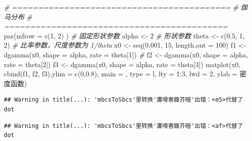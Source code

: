 \documentclass[
]{book}
\newenvironment{Shaded}{\begin{snugshade}}{\end{snugshade}}
\newcommand{\AttributeTok}[1]{\textcolor[rgb]{0.77,0.63,0.00}{#1}}
\newcommand{\CommentTok}[1]{\textcolor[rgb]{0.56,0.35,0.01}{\textit{#1}}}
\newcommand{\DecValTok}[1]{\textcolor[rgb]{0.00,0.00,0.81}{#1}}
\newcommand{\FloatTok}[1]{\textcolor[rgb]{0.00,0.00,0.81}{#1}}
\newcommand{\FunctionTok}[1]{\textcolor[rgb]{0.00,0.00,0.00}{#1}}
\newcommand{\NormalTok}[1]{#1}
\newcommand{\OtherTok}[1]{\textcolor[rgb]{0.56,0.35,0.01}{#1}}
\newcommand{\SpecialCharTok}[1]{\textcolor[rgb]{0.00,0.00,0.00}{#1}}
\newcommand{\StringTok}[1]{\textcolor[rgb]{0.31,0.60,0.02}{#1}}
\begin{document}
\begin{Shaded}
\begin{Highlighting}[]
\CommentTok{\# ==========================================}
\CommentTok{\# 伽马分布}
\CommentTok{\# ===========================================}
\FunctionTok{par}\NormalTok{(}\AttributeTok{mfrow =} \FunctionTok{c}\NormalTok{(}\DecValTok{1}\NormalTok{, }\DecValTok{2}\NormalTok{) )}
\CommentTok{\# 固定形状参数}
\NormalTok{alpha }\OtherTok{\textless{}{-}} \DecValTok{2}                \CommentTok{\# 形状参数}
\NormalTok{theta }\OtherTok{\textless{}{-}} \FunctionTok{c}\NormalTok{(}\FloatTok{0.5}\NormalTok{, }\DecValTok{1}\NormalTok{, }\DecValTok{2}\NormalTok{)     }\CommentTok{\# 比率参数，尺度参数为 1/theta}
\NormalTok{x0 }\OtherTok{\textless{}{-}} \FunctionTok{seq}\NormalTok{(}\FloatTok{0.001}\NormalTok{, }\DecValTok{15}\NormalTok{, }\AttributeTok{length.out =} \DecValTok{100}\NormalTok{)}
\NormalTok{f1 }\OtherTok{\textless{}{-}} \FunctionTok{dgamma}\NormalTok{(x0,  }\AttributeTok{shape =}\NormalTok{ alpha, }\AttributeTok{rate =}\NormalTok{ theta[}\DecValTok{1}\NormalTok{]) }\CommentTok{\# }
\NormalTok{f2 }\OtherTok{\textless{}{-}} \FunctionTok{dgamma}\NormalTok{(x0,  }\AttributeTok{shape =}\NormalTok{ alpha, }\AttributeTok{rate =}\NormalTok{ theta[}\DecValTok{2}\NormalTok{])}
\NormalTok{f3 }\OtherTok{\textless{}{-}} \FunctionTok{dgamma}\NormalTok{(x0,  }\AttributeTok{shape =}\NormalTok{ alpha, }\AttributeTok{rate =}\NormalTok{ theta[}\DecValTok{3}\NormalTok{])}
\FunctionTok{matplot}\NormalTok{(x0, }\FunctionTok{cbind}\NormalTok{(f1, f2, f3),}\AttributeTok{ylim =} \FunctionTok{c}\NormalTok{(}\DecValTok{0}\NormalTok{,}\FloatTok{0.8}\NormalTok{), }\AttributeTok{main =} \StringTok{\textquotesingle{}\textquotesingle{}}\NormalTok{,  }\AttributeTok{type =} \StringTok{\textquotesingle{}l\textquotesingle{}}\NormalTok{, }\AttributeTok{lty =} \DecValTok{1}\SpecialCharTok{:}\DecValTok{3}\NormalTok{, }\AttributeTok{lwd =} \DecValTok{2}\NormalTok{, }\AttributeTok{ylab =} \StringTok{\textquotesingle{}密度函数\textquotesingle{}}\NormalTok{)}
\end{Highlighting}
\end{Shaded}

\begin{verbatim}
## Warning in title(...): 'mbcsToSbcs'里转换'瀵嗗害鍑芥暟'出错：<e5>代替了dot
\end{verbatim}

\begin{verbatim}
## Warning in title(...): 'mbcsToSbcs'里转换'瀵嗗害鍑芥暟'出错：<af>代替了dot
\end{verbatim}
\end{document}

